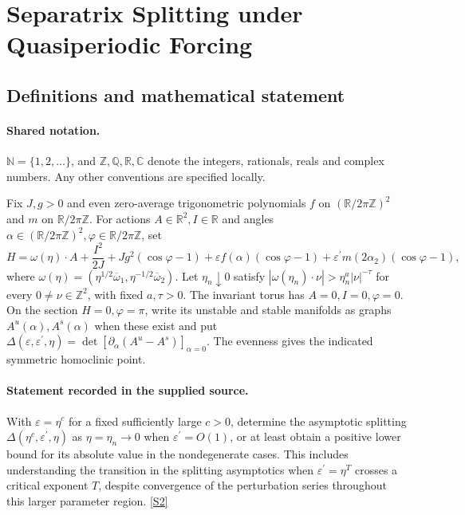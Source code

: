 \documentclass[11pt]{article}
\newcommand{\sref}[2]{\hyperlink{source:#1:#2}{[S#2]}}
\begin{document}
\section{Separatrix Splitting under Quasiperiodic Forcing}\label{statement}

\subsection{Definitions and mathematical statement}

\paragraph{Shared notation.}$\mathbb N=\{1,2,\ldots\}$, and $\mathbb Z,\mathbb Q,\mathbb R,\mathbb C$ denote the integers, rationals, reals and complex numbers. Any other conventions are specified locally.


Fix $J,g>0$ and even zero-average trigonometric polynomials $f$ on $(\mathbb R/2\pi\mathbb Z)^2$ and $m$ on $\mathbb R/2\pi\mathbb Z$. For actions $A\in\mathbb R^2,I\in\mathbb R$ and angles $\alpha\in(\mathbb R/2\pi\mathbb Z)^2,\varphi\in\mathbb R/2\pi\mathbb Z$, set \[H=\omega(\eta)\cdot A+\frac{I^2}{2J}+Jg^2(\cos\varphi-1)+\varepsilon f(\alpha)(\cos\varphi-1)+\varepsilon^{\prime}m(2\alpha_2)(\cos\varphi-1),\] where $\omega(\eta)=(\eta^{1/2}\overline\omega_1,\eta^{-1/2}\overline\omega_2)$. Let $\eta_n\downarrow0$ satisfy $|\omega(\eta_n)\cdot\nu|>\eta_n^a|\nu|^{-\tau}$ for every $0\ne\nu\in\mathbb Z^2$, with fixed $a,\tau>0$. The invariant torus has $A=0,I=0,\varphi=0$. On the section $H=0,\varphi=\pi$, write its unstable and stable manifolds as graphs $A^u(\alpha),A^s(\alpha)$ when these exist and put $\Delta(\varepsilon,\varepsilon^{\prime},\eta)=\det[\partial_\alpha(A^u-A^s)]_{\alpha=0}$. The evenness gives the indicated symmetric homoclinic point.
\paragraph{Statement recorded in the supplied source.}
With $\varepsilon=\eta^c$ for a fixed sufficiently large $c>0$, determine the asymptotic splitting $\Delta(\eta^c,\varepsilon^{\prime},\eta)$ as $\eta=\eta_n\to0$ when $\varepsilon^{\prime}=O(1)$, or at least obtain a positive lower bound for its absolute value in the nondegenerate cases. This includes understanding the transition in the splitting asymptotics when $\varepsilon^{\prime}=\eta^T$ crosses a critical exponent $T$, despite convergence of the perturbation series throughout this larger parameter region. \sref{statement}{2}
\end{document}
